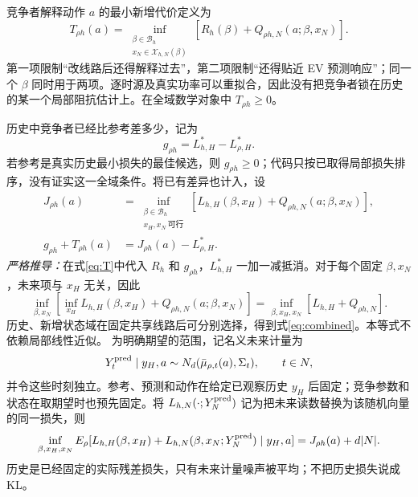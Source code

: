 \documentclass[UTF8,fontset=fandol,11pt,a4paper]{ctexart}
\begin{document}
竞争者解释动作 $a$ 的最小新增代价定义为
\begin{equation}
 T_{\rho h}(a)=
  \inf_{\substack{\beta\in\mathcal B_h\\
                       x_N\in\mathcal X_{h,N}(\beta)}}
       \left[R_h(\beta)+Q_{\rho h,N}(a;\beta,x_N)\right].
 \label{eq:T}
\end{equation}
第一项限制“改线路后还得解释过去”，第二项限制“还得贴近 EV 预测响应”；同一个 $\beta$ 同时用于两项。逐时源及真实功率可以重拟合，因此没有把竞争者锁在历史的某一个局部阻抗估计上。在全域数学对象中 $T_{\rho h}\ge0$。

历史中竞争者已经比参考差多少，记为
\begin{equation}
 g_{\rho h}=L_{h,H}^*-L_{\rho,H}^* .
 \label{eq:histgap}
\end{equation}
若参考是真实历史最小损失的最佳候选，则 $g_{\rho h}\ge0$；代码只按已取得局部损失排序，没有证实这一全域条件。将已有差异也计入，设
\begin{align}
 J_{\rho h}(a)&=
 \inf_{\substack{\beta\in\mathcal B_h\\x_H,x_N\ \text{可行}}}
 \left[L_{h,H}(\beta,x_H)+Q_{\rho h,N}(a;\beta,x_N)\right],
 \label{eq:designJ}\\
 g_{\rho h}+T_{\rho h}(a)&=J_{\rho h}(a)-L_{\rho,H}^*.
 \label{eq:combined}
\end{align}
\emph{严格推导：}在式\eqref{eq:T}中代入 $R_h$ 和 $g_{\rho h}$，$L_{h,H}^*$ 一加一减抵消。对于每个固定 $\beta,x_N$，未来项与 $x_H$ 无关，因此
\[
 \inf_{\beta,x_N}\left[\inf_{x_H}L_{h,H}(\beta,x_H)
                      +Q_{\rho h,N}(a;\beta,x_N)\right]
 =\inf_{\beta,x_H,x_N}[L_{h,H}+Q_{\rho h,N}].
\]
历史、新增状态域在固定共享线路后可分别选择，得到式\eqref{eq:combined}。本等式不依赖局部线性近似。
为明确期望的范围，记名义未来计量为
\[
 Y_t^{\rm pred}\mid y_H,a
       \sim N_d(\bar\mu_{\rho,t}(a),\Sigma_t),\qquad t\in N,
\]
并令这些时刻独立。参考、预测和动作在给定已观察历史 $y_H$ 后固定；竞争参数和状态在取期望时也预先固定。将 $L_{h,N}(\cdot;Y_N^{\rm pred})$ 记为把未来读数替换为该随机向量的同一损失，则
\[
 \inf_{\beta,x_H,x_N}
 E_\rho[L_{h,H}(\beta,x_H)+
        L_{h,N}(\beta,x_N;Y_N^{\rm pred})\mid y_H,a]
       =J_{\rho h}(a)+d|N|.
\]
历史是已经固定的实际残差损失，只有未来计量噪声被平均；不把历史损失说成 KL。
\end{document}
